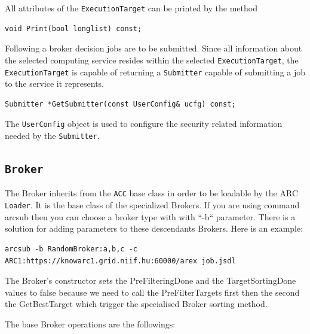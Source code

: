 \documentclass{book}
\newcommand{\ACC}{\texttt{ACC}}
\newcommand{\Broker}{\texttt{Broker}}
\newcommand{\ExecutionTarget}{\texttt{ExecutionTarget}}
\newcommand{\Submitter}{\texttt{Submitter}}
\newcommand{\UserConfig}{\texttt{UserConfig}}
\begin{document}
All attributes of the {\ExecutionTarget} can be printed by the method

\begin{shaded}
\begin{verbatim}
void Print(bool longlist) const;
\end{verbatim}
\end{shaded}

Following a broker decision jobs are to be submitted. Since all
information about the selected computing service resides within the
selected {\ExecutionTarget}, the {\ExecutionTarget} is capable of
returning a {\Submitter} capable of submitting a job to the service it
represents.

\begin{shaded}
\begin{verbatim}
Submitter *GetSubmitter(const UserConfig& ucfg) const;
\end{verbatim}
\end{shaded}

The {\UserConfig} object is used to configure the security related
information needed by the {\Submitter}.

\subsection{{\Broker}}

The Broker inherits from the {\ACC} base class in order to be loadable by the ARC \texttt{Loader}. It is the base class of the specialized Brokers. If you are using command arcsub then you can choose a broker type with with ``-b`` parameter. There is a solution for adding parameters to these descendants Brokers. Here is an example:

\begin{shaded}
\begin{verbatim}
arcsub -b RandomBroker:a,b,c -c ARC1:https://knowarc1.grid.niif.hu:60000/arex job.jsdl
\end{verbatim}
\end{shaded}

The Broker's constructor sets the PreFilteringDone and the TargetSortingDone values to false because we need to call the PreFilterTargets first then the second the GetBestTarget which trigger the specialised Broker sorting method.

The base Broker operations are the followings:
\end{document}
